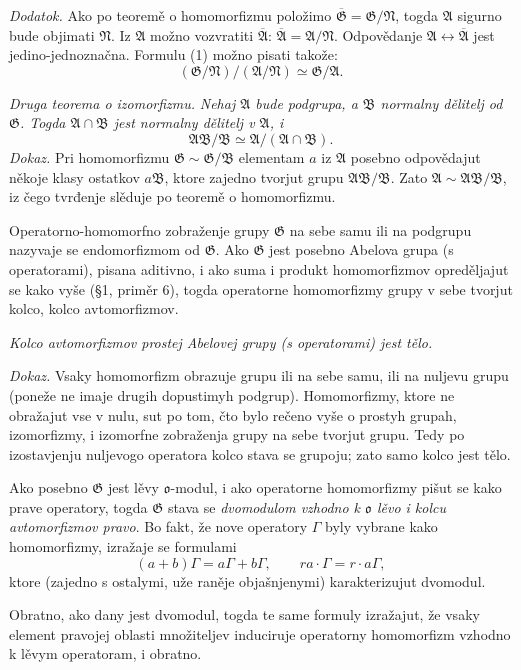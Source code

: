 \documentclass[11pt]{article}
\providecommand{\mG}{\mathfrak{G}}
\providecommand{\mA}{\mathfrak{A}}
\providecommand{\mB}{\mathfrak{B}}
\providecommand{\mN}{\mathfrak{N}}
\providecommand{\mo}{\mathfrak{o}}
\begin{document}
\emph{Dodatok.} Ako po teoremě o homomorfizmu položimo $\overline{\mG}=\mG/\mN$, togda $\mA$ sigurno bude objimati $\mN$. Iz $\mA$ možno vozvratiti $\overline{\mA}$: $\overline{\mA}=\mA/\mN$. Odpovědanje $\mA\leftrightarrow\overline{\mA}$ jest jedino-jednoznačna. Formulu (1) možno pisati takože:
\[
        (\mG/\mN)/(\mA/\mN)\simeq \mG/\mA.
\]

\emph{Druga teorema o izomorfizmu.} \emph{Nehaj $\mA$ bude podgrupa, a $\mB$ normalny dělitelj od $\mG$. Togda $\mA\cap\mB$ jest normalny dělitelj v $\mA$, i}
\[
        \mA\mB/\mB\simeq \mA/(\mA\cap\mB).
\]
\emph{Dokaz.} Pri homomorfizmu $\mG\sim\mG/\mB$ elementam $a$ iz $\mA$ posebno odpovědajut někoje klasy ostatkov $a\mB$, ktore zajedno tvorjut grupu $\mA\mB/\mB$. Zato $\mA\sim\mA\mB/\mB$, iz čego tvrđenje slěduje po teoremě o homomorfizmu.

Operatorno-homomorfno zobraženje grupy $\mG$ na sebe samu ili na podgrupu nazyvaje se endomorfizmom od $\mG$. Ako $\mG$ jest posebno Abelova grupa (s operatorami), pisana aditivno, i ako suma i produkt homomorfizmov opreděljajut se kako vyše (§1, priměr 6), togda operatorne homomorfizmy grupy v sebe tvorjut kolco, kolco avtomorfizmov.

\emph{Kolco avtomorfizmov prostej Abelovej grupy (s operatorami) jest tělo.}

\emph{Dokaz.} Vsaky homomorfizm obrazuje grupu ili na sebe samu, ili na nuljevu grupu (poneže ne imaje drugih dopustimyh podgrup). Homomorfizmy, ktore ne obražajut vse v nulu, sut po tom, čto bylo rečeno vyše o prostyh grupah, izomorfizmy, i izomorfne zobraženja grupy na sebe tvorjut grupu. Tedy po izostavjenju nuljevogo operatora kolco stava se grupoju; zato samo kolco jest tělo.

Ako posebno $\mG$ jest lěvy $\mo$-modul, i ako operatorne homomorfizmy pišut se kako prave operatory, togda $\mG$ stava se \emph{dvomodulom vzhodno k $\mo$ lěvo i kolcu avtomorfizmov pravo}. Bo fakt, že nove operatory $\Gamma$ byly vybrane kako homomorfizmy, izražaje se formulami
\[
        (a+b)\Gamma=a\Gamma+b\Gamma,
        \qquad ra\cdot\Gamma=r\cdot a\Gamma,
\]
ktore (zajedno s ostalymi, uže raněje objašnjenymi) karakterizujut dvomodul.

Obratno, ako dany jest dvomodul, togda te same formuly izražajut, že vsaky element pravojej oblasti množiteljev induciruje operatorny homomorfizm vzhodno k lěvym operatoram, i obratno.
\end{document}
